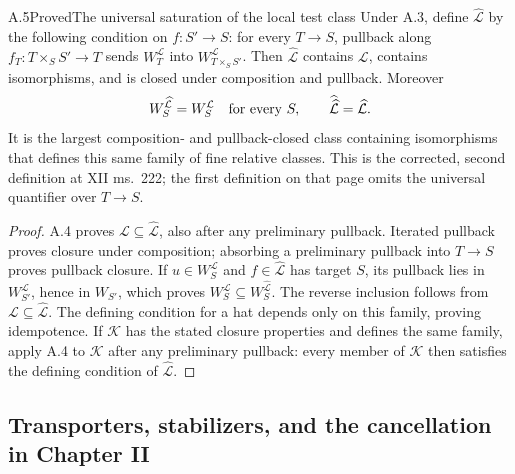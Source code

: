 \begin{claim}{A.5}{Proved}{The universal saturation of the local test class}
Under A.3, define $\widehat{\mathcal L}$ by the following condition on $f:S'\to S$: for every $T\to S$, pullback along $f_T:T\times_S S'\to T$ sends $W_T^{\mathcal L}$ into $W_{T\times_S S'}^{\mathcal L}$. Then $\widehat{\mathcal L}$ contains $\mathcal L$, contains isomorphisms, and is closed under composition and pullback. Moreover
\[
W_S^{\widehat{\mathcal L}}=W_S^{\mathcal L}
\quad\hbox{for every }S,\qquad
\widehat{\widehat{\mathcal L}}=\widehat{\mathcal L}.
\]
It is the largest composition- and pullback-closed class containing isomorphisms that defines this same family of fine relative classes. This is the corrected, second definition at XII ms.~222; the first definition on that page omits the universal quantifier over $T\to S$.
\end{claim}
\begin{proof}
A.4 proves $\mathcal L\subseteq\widehat{\mathcal L}$, also after any preliminary pullback. Iterated pullback proves closure under composition; absorbing a preliminary pullback into $T\to S$ proves pullback closure. If $u\in W_S^{\mathcal L}$ and $f\in\widehat{\mathcal L}$ has target $S$, its pullback lies in $W_{S'}^{\mathcal L}$, hence in $W_{S'}$, which proves $W_S^{\mathcal L}\subseteq W_S^{\widehat{\mathcal L}}$. The reverse inclusion follows from $\mathcal L\subseteq\widehat{\mathcal L}$. The defining condition for a hat depends only on this family, proving idempotence. If $\mathcal K$ has the stated closure properties and defines the same family, apply A.4 to $\mathcal K$ after any preliminary pullback: every member of $\mathcal K$ then satisfies the defining condition of $\widehat{\mathcal L}$.
\end{proof}

\subsection{Transporters, stabilizers, and the cancellation in Chapter II}

